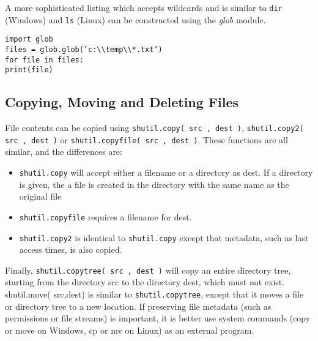 \documentclass[KSmain.tex]{subfiles}
\begin{document}
A more sophisticated listing which accepts wildcards and is similar to \texttt{dir} (Windows) and \texttt{ls} (Linux)
can be constructed using the \textit{glob} module.
\begin{framed}
\begin{verbatim}
import glob
files = glob.glob(’c:\\temp\\*.txt’)
for file in files:
print(file)
\end{verbatim}
\end{framed}
\subsection{ Copying, Moving and Deleting Files}
File contents can be copied using \texttt{shutil.copy( src , dest )}, \texttt{shutil.copy2( src , dest )} or \texttt{shutil.copyfile(
src , dest )}. These functions are all similar, and the differences are:
\begin{itemize}
\item \texttt{shutil.copy} will accept either a filename or a directory as dest. If a directory is given, the a file is
created in the directory with the same name as the original file
\item  \texttt{shutil.copyfile} requires a filename for dest.
\item  \texttt{shutil.copy2} is identical to \texttt{shutil.copy} except that metadata, such as last access times, is also
copied.
\end{itemize}
Finally, \texttt{shutil.copytree( src , dest )} will copy an entire directory tree, starting from the directory src to
the directory dest, which must not exist. shutil.move( src,dest) is similar to \texttt{shutil.copytree}, except that
it moves a file or directory tree to a new location. If preserving file metadata (such as permissions or file streams) is important, it is better use system commands (copy or move on Windows, cp or mv on Linux)
as an external program.
\end{document}
